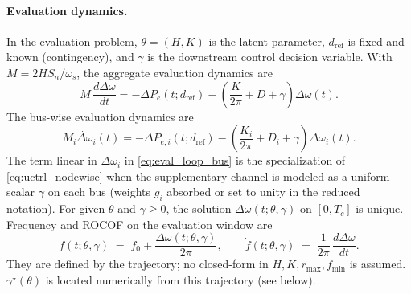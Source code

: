 \documentclass[10pt]{article}
\begin{document}
\paragraph{Evaluation dynamics.}
In the evaluation problem, $\theta=(H,K)$ is the latent parameter, $d_{\mathrm{ref}}$ is fixed and known (contingency), and $\gamma$ is the downstream control decision variable. With $M=2HS_n/\omega_s$, the aggregate evaluation dynamics are
\begin{equation}
\label{eq:eval_loop_agg}
M\,\frac{d\Delta\omega}{dt}
=
-\Delta P_e(t;d_{\mathrm{ref}})
-
\left(\frac{K}{2\pi}+D+\gamma\right)\Delta\omega(t).
\end{equation}
The bus-wise evaluation dynamics are
\begin{equation}
\label{eq:eval_loop_bus}
M_i \dot{\Delta\omega}_i(t)=-\Delta P_{e,i}(t;d_{\mathrm{ref}})-\left(\frac{K_i}{2\pi}+D_i+\gamma\right)\Delta\omega_i(t).
\end{equation}
The term linear in $\Delta\omega_i$ in \eqref{eq:eval_loop_bus} is the specialization of \eqref{eq:uctrl_nodewise} when the supplementary channel is modeled as a uniform scalar $\gamma$ on each bus (weights $g_i$ absorbed or set to unity in the reduced notation). For given $\theta$ and $\gamma\ge 0$, the solution $\Delta\omega(t;\theta,\gamma)$ on $[0,T_c]$ is unique. Frequency and ROCOF on the evaluation window are
\begin{equation}
f(t;\theta,\gamma)\;=\;f_0+\frac{\Delta\omega(t;\theta,\gamma)}{2\pi},\qquad \dot f(t;\theta,\gamma)\;=\;\frac{1}{2\pi}\,\frac{d\Delta\omega}{dt}.
\end{equation}
They are defined by the trajectory; no closed-form in $H,K,r_{\max},f_{\min}$ is assumed. $\gamma^\star(\theta)$ is located numerically from this trajectory (see below).
\end{document}
